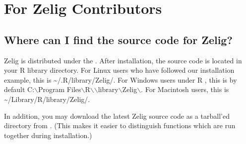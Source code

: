 \documentclass[letterpaper,10pt,english]{sphinxmanual}
\begin{document}
\section{For Zelig Contributors}
\label{10_faq:for-zelig-contributors}

\subsection{Where can I find the source code for Zelig?}
\label{10_faq:where-can-i-find-the-source-code-for-zelig}
Zelig is distributed under the . After installation, the source code is
located in your R library directory. For Linux users who have followed
our installation example, this is \textasciitilde{}/.R/library/Zelig/. For Windows users
under R , this is by default C:\(\backslash\)Program
Files\(\backslash\)R\(\backslash\)\(\backslash\)library\(\backslash\)Zelig\(\backslash\).
For Macintosh users, this is \textasciitilde{}/Library/R/library/Zelig/.

In addition, you may download the latest Zelig source code as a
tarball’ed directory from . (This makes it easier to distinguish
functions which are run together during installation.)
\end{document}
